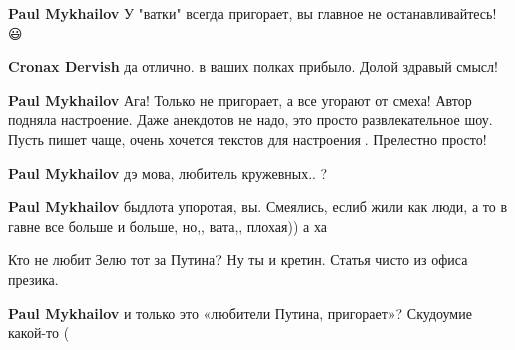 \begin{itemize}
\begin{itemize}
\textbf{Paul Mykhailov} У "ватки" всегда пригорает, вы главное не останавливайтесь! 😃

 
\textbf{Cronax Dervish} да отлично. в ваших полках прибыло. Долой здравый смысл!

 
\textbf{Paul Mykhailov} Ага! Только не пригорает, а все угорают от смеха! Автор подняла настроение. Даже анекдотов не надо, это просто развлекательное шоу. Пусть пишет чаще, очень хочется текстов для настроения🤣. Прелестно просто!

 
\textbf{Paul Mykhailov} дэ мова, любитель кружевных.. ?

 
\textbf{Paul Mykhailov} быдлота упоротая, вы. Смеялись, еслиб жили как люди, а то в гавне все больше и больше, но,, вата,, плохая)) а ха

 
Кто не любит Зелю тот за Путина? Ну ты и кретин. Статья чисто из офиса презика.

 
\textbf{Paul Mykhailov} и только это «любители Путина, пригорает»? Скудоумие какой-то (


\end{itemize}
\end{itemize}
